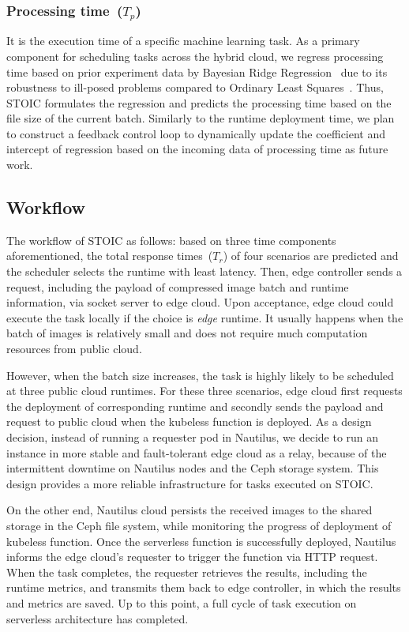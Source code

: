  \subsubsection{Processing time~($T_p$)} It is the execution time of a specific machine learning task. As a primary component for scheduling tasks across the hybrid cloud, we regress processing time based on prior experiment data by Bayesian Ridge Regression~\cite{ref:brr} due to its robustness to ill-posed problems compared to Ordinary Least Squares~\cite{ref:ols}. Thus, STOIC formulates the regression and predicts the processing time based on the file size of the current batch. Similarly to the runtime deployment time, we plan to construct a feedback control loop to dynamically update the coefficient and intercept of regression based on the incoming data of processing time as future work.
 
 \subsection{Workflow}
 The workflow of STOIC as follows: based on three time components aforementioned, the total response times~($T_r$) of four scenarios are predicted and the scheduler selects the runtime with least latency. Then, edge controller sends a request, including the payload of compressed image batch and runtime information, via socket server to edge cloud. Upon acceptance, edge cloud could execute the task locally if the choice is \textit{edge} runtime. It usually happens when the batch of images is relatively small and does not require much computation resources from public cloud.
 
 However, when the batch size increases, the task is highly likely to be scheduled at three public cloud runtimes. For these three scenarios, edge cloud first requests the deployment of corresponding runtime and secondly sends the payload and request to public cloud when the kubeless function is deployed. As a design decision, instead of running a requester pod in Nautilus, we decide to run an instance in more stable and fault-tolerant edge cloud as a relay, because of the intermittent downtime on Nautilus nodes and the Ceph storage system. This design provides a more reliable infrastructure for tasks executed on STOIC.
 
 On the other end, Nautilus cloud persists the received images to the shared storage in the Ceph file system, while monitoring the progress of deployment of kubeless function. Once the serverless function is successfully deployed, Nautilus informs the edge cloud's requester to trigger the function via HTTP request. When the task completes, the requester retrieves the results, including the runtime metrics, and transmits them back to edge controller, in which the results and metrics are saved. Up to this point, a full cycle of task execution on serverless architecture has completed.
 
